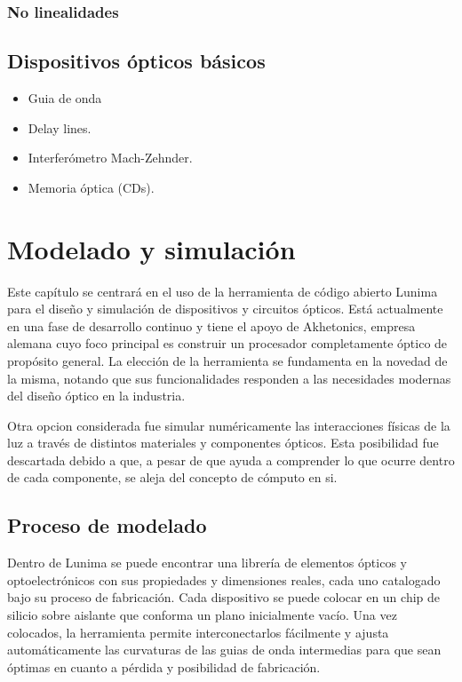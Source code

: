 \documentclass[12pt,a4paper]{report}
\begin{document}
\subsection{No linealidades}

\section{Dispositivos ópticos básicos}

\begin{itemize}[nosep]
    \item Guia de onda
    \item Delay lines.
    \item Interferómetro Mach-Zehnder.
    \item Memoria óptica (CDs).
\end{itemize}


\chapter{Modelado y simulación}

Este capítulo se centrará en el uso de la herramienta de código abierto Lunima~\cite{lunima} para el diseño y simulación de dispositivos y circuitos ópticos. Está actualmente en una fase de desarrollo continuo y tiene el apoyo de Akhetonics, empresa alemana cuyo foco principal es construir un procesador completamente óptico de propósito general. La elección de la herramienta se fundamenta en la novedad de la misma, notando que sus funcionalidades responden a las necesidades modernas del diseño óptico en la industria.

Otra opcion considerada fue simular numéricamente las interacciones físicas de la luz a través de distintos materiales y componentes ópticos. Esta posibilidad fue descartada debido a que, a pesar de que ayuda a comprender lo que ocurre dentro de cada componente, se aleja del concepto de cómputo en si.

\section{Proceso de modelado}

Dentro de Lunima se puede encontrar una librería de elementos ópticos y optoelectrónicos con sus propiedades y dimensiones reales, cada uno catalogado bajo su proceso de fabricación. Cada dispositivo se puede colocar en un chip de silicio sobre aislante que conforma un plano inicialmente vacío. Una vez colocados, la herramienta permite interconectarlos fácilmente y ajusta automáticamente las curvaturas de las guias de onda intermedias para que sean óptimas en cuanto a pérdida y posibilidad de fabricación.
\end{document}
